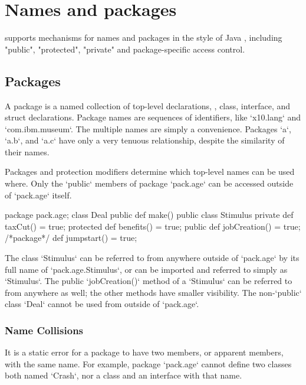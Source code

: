 \chapter{Names and packages}
\label{packages} 

\Xten{} supports mechanisms for names and packages in the style of Java
\cite[\S 6,\S 7]{jls2}, including \xcd"public", \xcd"protected", \xcd"private"
and package-specific access control.

\section{Packages}

A package is a named collection of top-level declarations, \viz, class,
interface, and struct declarations.  Package names are sequences of
identifiers, like \xcd`x10.lang` and \xcd`com.ibm.museum`. The multiple
names are simply a convenience.  Packages \xcd`a`, \xcd`a.b`, and \xcd`a.c`
have only a very tenuous relationship, despite the similarity of their names. 

Packages and protection modifiers determine which top-level names can be used
where. Only the \xcd`public` members of package \xcd`pack.age` can be accessed
outside of \xcd`pack.age` itself.  
%
\begin{xten}
package pack.age;
class Deal {
  public def make() {}
}
public class Stimulus {
  private def taxCut() = true;
  protected def benefits() = true;
  public def jobCreation() = true;
  /*package*/ def jumpstart() = true;
}
\end{xten}
%

The class \xcd`Stimulus` can be referred to from anywhere outside of
\xcd`pack.age` by its full name of \xcd`pack.age.Stimulus`, or can be imported
and referred to simply as \xcd`Stimulus`.  The public \xcd`jobCreation()`
method of a \xcd`Stimulus` can be referred to from anywhere as well; the other
methods have smaller visibility.  The non-\xcd`public` class \xcd`Deal` cannot
be used from outside of \xcd`pack.age`.  



\subsection{Name Collisions}

It is a static error for a package to have two members, or apparent members,
with the same name.  For example, package \xcd`pack.age` cannot define two
classes both named \xcd`Crash`, nor a class and an interface with that name.

